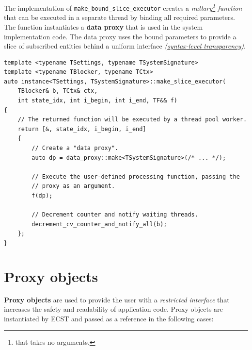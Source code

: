 \documentclass[twoside, 12pt, a4paper, openright]{book}
\begin{document}
The implementation of
\texttt{make_bound_slice_executor}
creates a \emph{nullary\footnote{that takes no arguments.} function}
that can be executed in a separate thread by binding all required
parameters. The function instantiates a \textbf{data proxy} that is used
in the system implementation code. The data proxy uses the bound
parameters to provide a slice of subscribed entities behind a uniform
interface
\emph{(\protect\hyperlink{ecstoverview_syntaxtransp}{syntax-level
transparency})}.

\begin{verbatim}
template <typename TSettings, typename TSystemSignature>
template <typename TBlocker, typename TCtx>
auto instance<TSettings, TSystemSignature>::make_slice_executor(
    TBlocker& b, TCtx& ctx,
    int state_idx, int i_begin, int i_end, TF&& f)
{
    // The returned function will be executed by a thread pool worker.
    return [&, state_idx, i_begin, i_end]
    {
        // Create a "data proxy".
        auto dp = data_proxy::make<TSystemSignature>(/* ... */);

        // Execute the user-defined processing function, passing the
        // proxy as an argument.
        f(dp);

        // Decrement counter and notify waiting threads.
        decrement_cv_counter_and_notify_all(b);
    };
}
\end{verbatim}

\hypertarget{chap_proxies}{\chapter{Proxy objects}\label{chap_proxies}}

\textbf{Proxy objects} are used to provide the user with a
\emph{restricted interface} that increases the safety and readability of
application code. Proxy objects are instantiated by ECST and passed as a
reference in the following cases:
\end{document}

